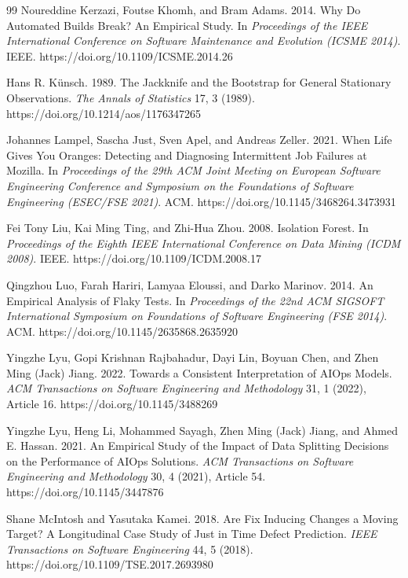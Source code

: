 \documentclass[sigconf,review,anonymous,nonacm]{acmart}
\begin{document}
\begin{thebibliography}{99}
Noureddine Kerzazi, Foutse Khomh, and Bram Adams. 2014.
Why Do Automated Builds Break? An Empirical Study.
In \textit{Proceedings of the IEEE International Conference on Software Maintenance and Evolution (ICSME 2014)}. IEEE. https://doi.org/10.1109/ICSME.2014.26

Hans R. K\"{u}nsch. 1989.
The Jackknife and the Bootstrap for General Stationary Observations.
\textit{The Annals of Statistics} 17, 3 (1989). https://doi.org/10.1214/aos/1176347265

Johannes Lampel, Sascha Just, Sven Apel, and Andreas Zeller. 2021.
When Life Gives You Oranges: Detecting and Diagnosing Intermittent Job Failures at Mozilla.
In \textit{Proceedings of the 29th ACM Joint Meeting on European Software Engineering Conference and Symposium on the Foundations of Software Engineering (ESEC/FSE 2021)}. ACM. https://doi.org/10.1145/3468264.3473931

Fei Tony Liu, Kai Ming Ting, and Zhi-Hua Zhou. 2008.
Isolation Forest.
In \textit{Proceedings of the Eighth IEEE International Conference on Data Mining (ICDM 2008)}. IEEE. https://doi.org/10.1109/ICDM.2008.17

Qingzhou Luo, Farah Hariri, Lamyaa Eloussi, and Darko Marinov. 2014.
An Empirical Analysis of Flaky Tests.
In \textit{Proceedings of the 22nd ACM SIGSOFT International Symposium on Foundations of Software Engineering (FSE 2014)}. ACM. https://doi.org/10.1145/2635868.2635920

Yingzhe Lyu, Gopi Krishnan Rajbahadur, Dayi Lin, Boyuan Chen, and Zhen Ming (Jack) Jiang. 2022.
Towards a Consistent Interpretation of AIOps Models.
\textit{ACM Transactions on Software Engineering and Methodology} 31, 1 (2022), Article 16. https://doi.org/10.1145/3488269

Yingzhe Lyu, Heng Li, Mohammed Sayagh, Zhen Ming (Jack) Jiang, and Ahmed E. Hassan. 2021.
An Empirical Study of the Impact of Data Splitting Decisions on the Performance of AIOps Solutions.
\textit{ACM Transactions on Software Engineering and Methodology} 30, 4 (2021), Article 54. https://doi.org/10.1145/3447876

Shane McIntosh and Yasutaka Kamei. 2018.
Are Fix Inducing Changes a Moving Target? A Longitudinal Case Study of Just in Time Defect Prediction.
\textit{IEEE Transactions on Software Engineering} 44, 5 (2018). https://doi.org/10.1109/TSE.2017.2693980


\end{thebibliography}
\end{document}
